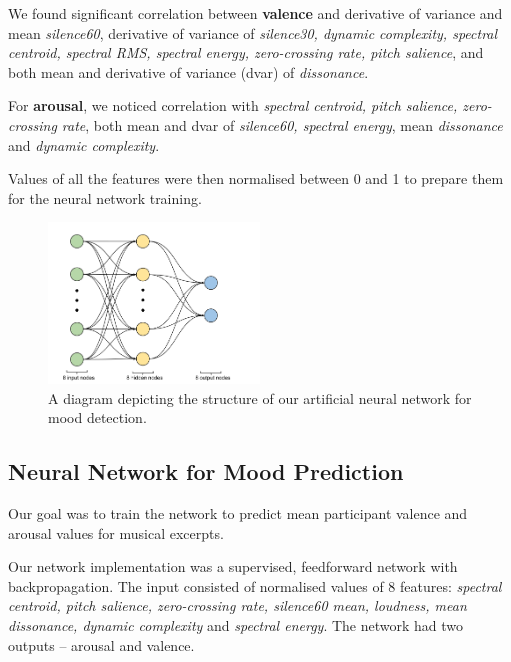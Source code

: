 \vspace{20pt}

We found significant correlation between \textbf{valence} and derivative of variance and mean \textit{silence60}, derivative of variance of \textit{silence30, dynamic complexity, spectral centroid, spectral RMS, spectral energy, zero-crossing rate, pitch salience}, and both mean and derivative of variance (dvar) of \textit{dissonance}. 

For \textbf{arousal}, we noticed correlation with \textit{spectral centroid, pitch salience, zero-crossing rate}, both mean and dvar of  \textit{silence60, spectral energy}, mean \textit{dissonance} and \textit{dynamic complexity}. 

Values of all the features were then normalised between 0 and 1 to prepare them for the neural network training. 

\begin{figure}
  \vspace{-30pt}
  \begin{center}
    \includegraphics[width=0.5\textwidth]{Figures/myANN}
  \end{center}
  \caption{A diagram depicting the structure of our artificial neural network for mood detection.}
\label{fig:finalnetwork}
\end{figure}

\vspace{10pt}

\subsection{Neural Network for Mood Prediction}

Our goal was to train the network to predict mean participant valence and arousal values for musical excerpts.
 
Our network implementation was a supervised, feedforward network with backpropagation. 
The input consisted of normalised values of 8 features:
\textit{spectral centroid, pitch salience, zero-crossing rate, silence60 mean, loudness, mean dissonance, dynamic complexity} and \textit{spectral energy}. 
The network had two outputs -- arousal and valence.

